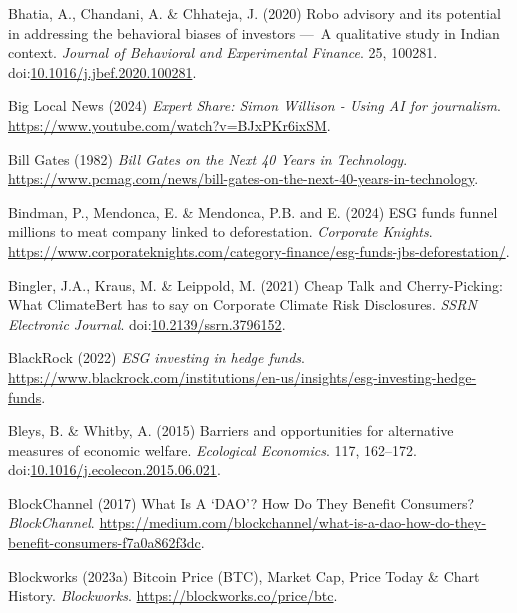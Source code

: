 \documentclass[
  letterpaper,
  DIV=11,
  numbers=noendperiod]{scrartcl}
\newlength{\cslhangindent}
\newenvironment{CSLReferences}[2] %
 {\begin{list}{}{%
  \setlength{\itemindent}{0pt}
  \setlength{\leftmargin}{0pt}
  \setlength{\parsep}{0pt}
  \ifodd #1
   \setlength{\leftmargin}{\cslhangindent}
   \setlength{\itemindent}{-1\cslhangindent}
  \fi
  \setlength{\itemsep}{#2\baselineskip}}}
 {\end{list}}
\begin{document}
\begin{CSLReferences}{0}{1}
Bhatia, A., Chandani, A. \& Chhateja, J. (2020) Robo advisory and its
potential in addressing the behavioral biases of investors ---~{A}
qualitative study in {Indian} context. \emph{Journal of Behavioral and
Experimental Finance}. 25, 100281.
doi:\href{https://doi.org/10.1016/j.jbef.2020.100281}{10.1016/j.jbef.2020.100281}.

Big Local News (2024) \emph{Expert {Share}: {Simon Willison} - {Using
AI} for journalism}. \url{https://www.youtube.com/watch?v=BJxPKr6ixSM}.

Bill Gates (1982) \emph{Bill {Gates} on the {Next} 40 {Years} in
{Technology}}.
\url{https://www.pcmag.com/news/bill-gates-on-the-next-40-years-in-technology}.

Bindman, P., Mendonca, E. \& Mendonca, P.B. and E. (2024) {ESG} funds
funnel millions to meat company linked to deforestation. \emph{Corporate
Knights}.
\url{https://www.corporateknights.com/category-finance/esg-funds-jbs-deforestation/}.

Bingler, J.A., Kraus, M. \& Leippold, M. (2021) Cheap {Talk} and
{Cherry-Picking}: {What ClimateBert} has to say on {Corporate Climate
Risk Disclosures}. \emph{SSRN Electronic Journal}.
doi:\href{https://doi.org/10.2139/ssrn.3796152}{10.2139/ssrn.3796152}.

BlackRock (2022) \emph{{ESG} investing in hedge funds}.
\url{https://www.blackrock.com/institutions/en-us/insights/esg-investing-hedge-funds}.

Bleys, B. \& Whitby, A. (2015) Barriers and opportunities for
alternative measures of economic welfare. \emph{Ecological Economics}.
117, 162--172.
doi:\href{https://doi.org/10.1016/j.ecolecon.2015.06.021}{10.1016/j.ecolecon.2015.06.021}.

BlockChannel (2017) What {Is A} {`{DAO}'}? {How Do They Benefit
Consumers}? \emph{BlockChannel}.
\url{https://medium.com/blockchannel/what-is-a-dao-how-do-they-benefit-consumers-f7a0a862f3dc}.

Blockworks (2023a) Bitcoin {Price} ({BTC}), {Market Cap}, {Price Today}
\& {Chart History}. \emph{Blockworks}.
\url{https://blockworks.co/price/btc}.


\end{CSLReferences}
\end{document}
